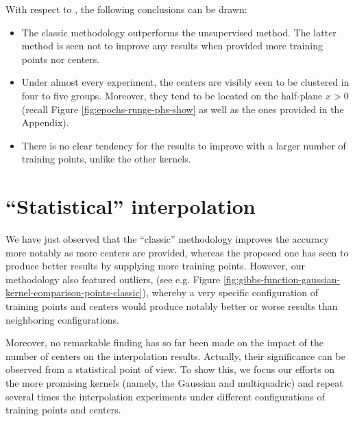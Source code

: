 \documentclass[12pt]{report} %
\newcommand{\tmverbatim}[1]{\text{{\ttfamily{#1}}}}
\begin{document}
With respect to \tmverbatim{phs\_kernel}, the following conclusions can be
drawn:
\begin{itemize}
  \item The classic methodology outperforms the unsupervised method. The
        latter method is seen not to improve any results when provided more training
        points nor centers.

  \item Under almost every experiment, the centers are visibly seen to be
        clustered in four to five groups. Moreover, they tend to be located on the
        half-plane $x > 0$ (recall Figure \ref{fig:epochs-runge-phs-show} as well as
        the ones provided in the Appendix).

  \item There is no clear tendency for the results to improve with a larger
        number of training points, unlike the other kernels. %
\end{itemize}


\clearpage
\section{``Statistical'' interpolation}

We have just observed that the ``classic'' methodology improves the accuracy
more notably as more centers are provided,
whereas the proposed one has seen to produce better results by supplying more
training points. However, our methodology also featured outliers,
(see e.g. Figure \ref{fig:gibbs-function-gaussian-kernel-comparison-points-classic}),
whereby a very specific configuration of training points and centers would
produce notably better or worse results than neighboring configurations.

Moreover, no remarkable finding has so far been made on the impact of the number of
centers on the interpolation results. Actually, their significance can be
observed from a statistical point of view. To show this, we focus our efforts on
the more promising kernels (namely, the Gaussian and multiquadric) and repeat several
times the interpolation experiments under different configurations of
training points and centers.
\end{document}
